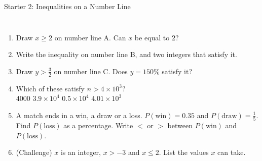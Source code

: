 \documentclass{beamer}
\newcommand{\ashow}[1]{\uncover<2->{\textcolor{red}{\small #1}}}
\newcommand{\tightlist}{%
  \setlength{\itemsep}{0pt}\setlength{\parskip}{0pt}\setlength{\topsep}{0pt}%
}
\begin{document}
\begin{frame}[t]{Starter 2: Inequalities on a Number Line}
\begin{columns}[T,onlytextwidth]
\vspace{-1.5em}
\footnotesize
\begin{enumerate}\tightlist
{}
  \item Draw $x\geq2$ on number line A. Can $x$ be equal to $2$?
        \ashow{Yes: $\geq$ includes $2$, so the circle is filled.}
  \item Write the inequality on number line B, and two integers that satisfy it.
        \ashow{$x<-1$; \; for example $-2$ and $-3$}
  \item Draw $y>\frac32$ on number line C. Does $y=150\%$ satisfy it?
        \ashow{No: $150\%=\tfrac32$, not more than $\tfrac32$.}
  \item Which of these satisfy $n>4\times10^3$?\\[1pt]
        \hspace*{1em}$4000$ \quad $3.9\times10^4$ \quad $0.5\times10^4$ \quad $4.01\times10^3$\\
        \ashow{All except $4000$, which equals $4\times10^3$}
  \item A match ends in a win, a draw or a loss. $P(\text{win})=0.35$ and
        $P(\text{draw})=\frac15$. Find $P(\text{loss})$ as a percentage. Write $<$ or $>$
        between $P(\text{win})$ and $P(\text{loss})$.
        \ashow{$45\%$, so $P(\text{win})<P(\text{loss})$}
  \item (Challenge) $x$ is an integer, $x>-3$ and $x\leq2$. List the values $x$ can take.
        \ashow{$-2,\ -1,\ 0,\ 1,\ 2$}
\end{enumerate}
\end{columns}
\end{frame}
\end{document}
